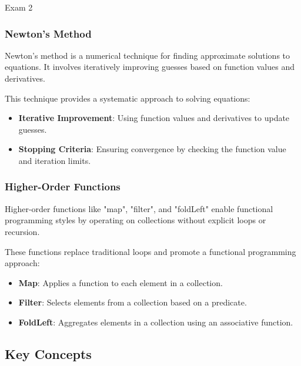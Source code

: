 \begin{examnotes}{Exam 2}
    \subsubsection*{Newton's Method}
    
    Newton's method is a numerical technique for finding approximate solutions to equations. It involves iteratively improving guesses based on function values and derivatives.
    
    \begin{highlight}
        This technique provides a systematic approach to solving equations:
        \begin{itemize}
            \item \textbf{Iterative Improvement}: Using function values and derivatives to update guesses.
            \item \textbf{Stopping Criteria}: Ensuring convergence by checking the function value and iteration limits.
        \end{itemize}
    \end{highlight}
    
    \subsubsection*{Higher-Order Functions}
    
    Higher-order functions like "map", "filter", and "foldLeft" enable functional programming styles by operating on collections without explicit loops or recursion.
    
    \begin{highlight}
        These functions replace traditional loops and promote a functional programming approach:
        \begin{itemize}
            \item \textbf{Map}: Applies a function to each element in a collection.
            \item \textbf{Filter}: Selects elements from a collection based on a predicate.
            \item \textbf{FoldLeft}: Aggregates elements in a collection using an associative function.
        \end{itemize}
    \end{highlight}
    
    \subsection*{Key Concepts}
    

\end{examnotes}
